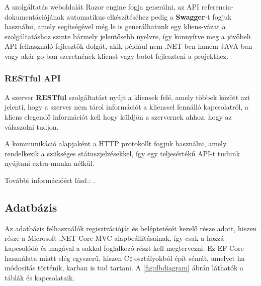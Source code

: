 \documentclass[twoside, a4paper, 12pt]{book}
\begin{document}
A szolgáltatás weboldalát Razor engine fogja generálni, az API referencia-dokumentációjának automatikus elkészítéséhez pedig a \textbf{Swagger}-t fogjuk használni, amely segítségével még le is generálhatunk egy kliens-vázat a szolgáltatáshoz szinte bármely jelentősebb nyelvre, így könnyítve meg a jövőbeli API-felhasználó fejlesztők dolgát, akik például nem .NET-ben hanem JAVA-ban vagy akár go-ban szeretnének klienst vagy botot fejleszteni a projekthez.

\subsubsection{RESTful API}
A szerver \textbf{RESTful} szolgáltatást nyújt a kliensek felé, amely többek között azt jelenti, hogy a szerver nem tárol információt a klienssel fennálló kapcsolatról, a kliens elegendő információt kell hogy küldjön a szervernek ahhoz, hogy az válaszolni tudjon.

A kommunikáció alapjaként a HTTP protokollt fogjuk használni, amely rendelkezik a szükséges státuszjelzésekkel, így egy teljesértékű API-t tudunk nyújtani extra-munka nélkül.

További információért lásd.: \cite{restfulEn}.

\subsection{Adatbázis}
Az adatbázis felhasználók regisztrációját és beléptetését kezelő része adott, hiszen része a Microsoft .NET Core MVC alapbeállításainak, így csak a hozzá kapcsolódó és magával a sakkal foglalkozó részt kell megtervezni. Ez EF Core használata miatt elég egyszerű, hiszen C$\sharp$ osztályokból épít sémát, amelyet ha módosítás történik, karban is tud tartani. A \ref{fig:dbdiagram} ábrán láthatók a táblák és kapcsolataik.
\end{document}
